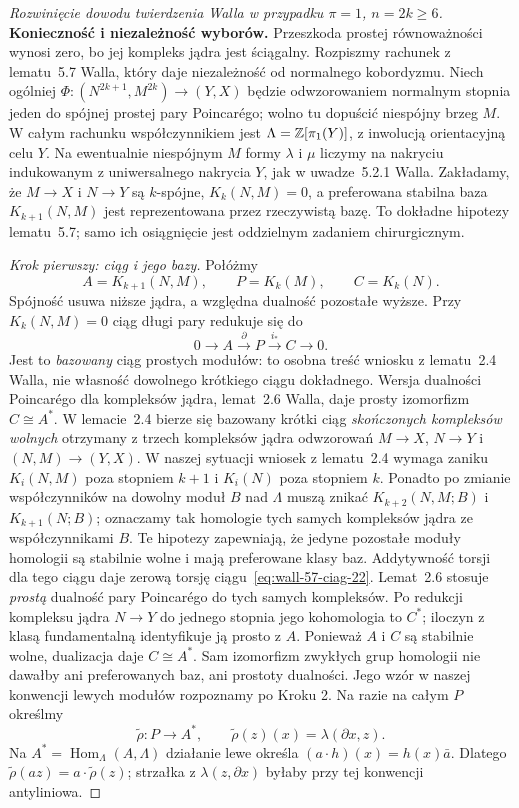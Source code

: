 \begin{proof}[Rozwinięcie dowodu twierdzenia Walla w przypadku
 $\pi=1$, $n=2k\geq6$]
\textbf{Konieczność i niezależność wyborów.}
Przeszkoda prostej równoważności wynosi
zero, bo jej kompleks jądra jest ściągalny.
Rozpiszmy rachunek z lematu~5.7 Walla,
który daje niezależność od normalnego
kobordyzmu. Niech ogólniej
$\Phi:(N^{2k+1},M^{2k})\to(Y,X)$ będzie
odwzorowaniem normalnym stopnia jeden
do spójnej prostej pary Poincarégo; wolno
tu dopuścić niespójny brzeg $M$.
W całym rachunku współczynnikiem jest
$\Lambda=\mathbb{Z}[\pi_1(Y)]$, z inwolucją
orientacyjną celu $Y$. Na ewentualnie
niespójnym $M$ formy
$\lambda$ i $\mu$ liczymy na nakryciu
indukowanym z uniwersalnego nakrycia $Y$,
jak w uwadze~5.2.1 Walla. Zakładamy,
że $M\to X$ i $N\to Y$ są $k$-spójne,
$K_k(N,M)=0$, a preferowana stabilna baza
$K_{k+1}(N,M)$ jest reprezentowana przez
rzeczywistą bazę. To dokładne hipotezy
lematu~5.7; samo ich osiągnięcie jest
oddzielnym zadaniem chirurgicznym.

\emph{Krok pierwszy: ciąg i jego bazy.}
Połóżmy
\[
 A=K_{k+1}(N,M),\qquad P=K_k(M),
 \qquad C=K_k(N).
\]
Spójność usuwa niższe jądra, a względna
dualność pozostałe wyższe. Przy
$K_k(N,M)=0$ ciąg długi pary redukuje się do
\begin{equation}\label{eq:wall-57-ciag-22}
 0\longrightarrow A\xrightarrow{\,\partial\,}P
 \xrightarrow{\,i_*\,}C\longrightarrow0.
\end{equation}
Jest to \emph{bazowany} ciąg prostych modułów:
to osobna treść wniosku z lematu~2.4 Walla,
nie własność dowolnego krótkiego ciągu
dokładnego. Wersja dualności Poincarégo
dla kompleksów jądra, lemat~2.6 Walla,
daje prosty izomorfizm $C\cong A^*$.
W lemacie~2.4 bierze się bazowany krótki ciąg
\emph{skończonych kompleksów wolnych} otrzymany
z trzech kompleksów jądra odwzorowań $M\to X$,
$N\to Y$ i $(N,M)\to(Y,X)$. W naszej sytuacji
wniosek z lematu~2.4 wymaga zaniku
$K_i(N,M)$ poza stopniem $k+1$ i $K_i(N)$
poza stopniem $k$. Ponadto po zmianie
współczynników na dowolny moduł $B$ nad
$\Lambda$ muszą znikać
$K_{k+2}(N,M;B)$ i $K_{k+1}(N;B)$;
oznaczamy tak homologie tych samych
kompleksów jądra ze współczynnikami $B$.
Te hipotezy
zapewniają, że jedyne pozostałe moduły homologii
są stabilnie wolne i mają preferowane klasy baz.
Addytywność torsji dla tego ciągu daje zerową
torsję ciągu~\eqref{eq:wall-57-ciag-22}.
Lemat~2.6 stosuje \emph{prostą} dualność pary
Poincarégo do tych samych kompleksów. Po
redukcji kompleksu jądra $N\to Y$ do jednego
stopnia jego kohomologia to $C^*$; iloczyn
z klasą fundamentalną identyfikuje ją prosto
z $A$. Ponieważ $A$ i $C$ są stabilnie wolne,
dualizacja daje $C\cong A^*$.
Sam
izomorfizm zwykłych grup homologii nie dawałby
ani preferowanych baz, ani prostoty dualności.
Jego wzór w naszej konwencji lewych
modułów rozpoznamy po Kroku 2. Na razie
na całym $P$ określmy
\[
 \widetilde\rho:P\longrightarrow A^*,
 \qquad \widetilde\rho(z)(x)=\lambda(\partial x,z).
\]
Na $A^*=\operatorname{Hom}_\Lambda(A,\Lambda)$
działanie lewe określa
$(a\cdot h)(x)=h(x)\bar a$.
Dlatego $\widetilde\rho(az)=a\cdot
\widetilde\rho(z)$;
strzałka z $\lambda(z,\partial x)$
byłaby przy tej konwencji antyliniowa.


\end{proof}
